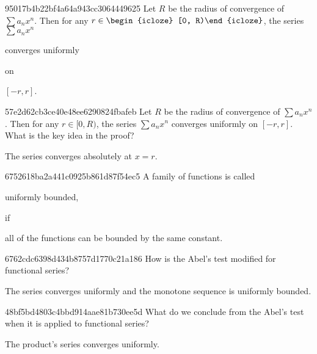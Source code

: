 \begin{note}{95017b4b22bf4a64a943cc3064449625}
    Let \({ R }\) be the radius of convergence of \({ \sum a_n x^{n} }\).
    Then for any \({ r \in \begin{icloze}{3}[0, R)\end{icloze} }\), the series \({ \sum a_n x^{n} }\) \begin{icloze}{2}converges uniformly\end{icloze} on \begin{icloze}{1}\({ [-r, r] }\).\end{icloze}
\end{note}

\begin{note}{57e2d62cb3ce40e48ee6290824fbafeb}
    Let \({ R }\) be the radius of convergence of \({ \sum a_n x^{n} }\).
    Then for any \({ r \in [0, R) }\), the series \({ \sum a_n x^{n} }\) converges uniformly on \({ [-r, r] }\).
    What is the key idea in the proof?

    \begin{cloze}{1}
        The series converges absolutely at \({ x = r }\).
    \end{cloze}
\end{note}

\begin{note}{6752618ba2a441c0925b861d87f54ec5}
    A family of functions is called \begin{icloze}{2}uniformly bounded,\end{icloze} if \begin{icloze}{1}all of the functions can be bounded by the same constant.\end{icloze}
\end{note}

\begin{note}{6762cdc6398d434b8757d1770c21a186}
    How is the Abel's test modified for functional series?

    \begin{cloze}{1}
        The series converges uniformly and the monotone sequence is uniformly bounded.
    \end{cloze}
\end{note}

\begin{note}{48bf5bd4803c4bbd914aae81b730ee5d}
    What do we conclude from the Abel's test when it is applied to functional series?

    \begin{cloze}{1}
        The product's series converges uniformly.
    \end{cloze}
\end{note}

